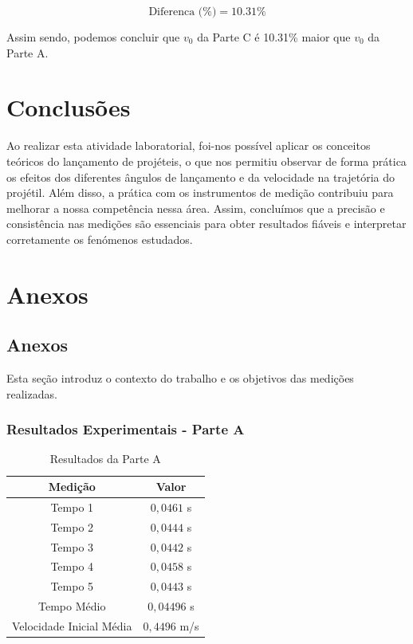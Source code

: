 \documentclass{report}
\begin{document}
\[
\text{Diferenca (\%)} = 10.31\%
\]


Assim sendo, podemos concluir que \(v_0\) da Parte C é 10.31\% maior que \(v_0\) da Parte A.



\chapter{Conclusões}
\label{chap.conclusao}
Ao realizar esta atividade laboratorial, foi-nos possível aplicar os conceitos teóricos do lançamento de projéteis, o que nos permitiu observar de forma prática os efeitos dos diferentes ângulos de lançamento e da velocidade na trajetória do projétil. Além disso, a prática com os instrumentos de medição contribuiu para melhorar a nossa competência nessa área. Assim, concluímos que a precisão e consistência nas medições são essenciais para obter resultados fiáveis e interpretar corretamente os fenómenos estudados.

\chapter{Anexos}
\label{chap.anexos}

\section{Anexos}

Esta seção introduz o contexto do trabalho e os objetivos das medições realizadas.

\subsection{Resultados Experimentais - Parte A}
\begin{table}[H]
    \centering
    \begin{tabular}{|c|c|}
        \hline
        \textbf{Medição} & \textbf{Valor} \\
        \hline
        Tempo 1 & $0,0461$ s \\
        Tempo 2 & $0,0444$ s \\
        Tempo 3 & $0,0442$ s \\
        Tempo 4 & $0,0458$ s \\
        Tempo 5 & $0,0443$ s \\
        \hline
        Tempo Médio & $0,04496$ s \\
        Velocidade Inicial Média & $0,4496$ m/s \\
        \hline
    \end{tabular}
    \caption{Resultados da Parte A}
    \label{tab:parte_a}
\end{table}
\end{document}
